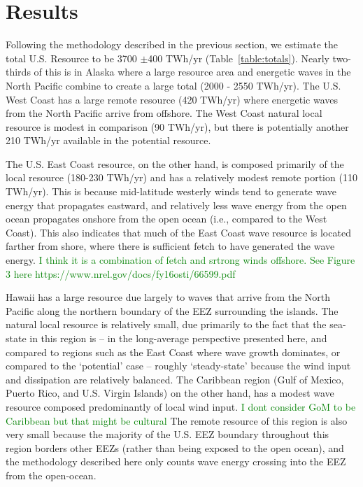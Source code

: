 \section{Results}

Following the methodology described in the previous section, we estimate the total U.S. Resource to be 3700 $\pm$400 TWh/yr (Table~\ref{table:totals}). Nearly two-thirds of this is in Alaska where a large resource area and energetic waves in the North Pacific combine to create a large total (2000 - 2550 TWh/yr). The U.S. West Coast has a large remote resource (420 TWh/yr) where energetic waves from the North Pacific arrive from offshore.  The West Coast natural local resource is modest in comparison (90 TWh/yr), but there is potentially another 210 TWh/yr available in the potential resource.

The U.S. East Coast resource, on the other hand, is composed primarily of the local resource (180-230 TWh/yr) and has a relatively modest remote portion (110 TWh/yr). This is because mid-latitude westerly winds tend to generate wave energy that propagates eastward, and relatively less wave energy from the open ocean propagates onshore from the open ocean (i.e., compared to the West Coast). This also indicates that much of the East Coast wave resource is located farther from shore, where there is sufficient fetch to have generated the wave energy.  \textcolor{green}{I think it is a combination of fetch and srtrong winds offshore. See Figure 3 here {https://www.nrel.gov/docs/fy16osti/66599.pdf}}

Hawaii has a large resource due largely to waves that arrive from the North Pacific along the northern boundary of the EEZ surrounding the islands. The natural local resource is relatively small, due primarily to the fact that the sea-state in this region is -- in the long-average perspective presented here, and compared to regions such as the East Coast where wave growth dominates, or compared to the `potential' case -- roughly `steady-state' because the wind input and dissipation are relatively balanced. The Caribbean region (Gulf of Mexico, Puerto Rico, and U.S. Virgin Islands) on the other hand, has a modest wave resource composed predominantly of local wind input.  \textcolor{green}{I dont consider GoM to be Caribbean but that might be cultural} The remote resource of this region is also very small because the majority of the U.S. EEZ boundary throughout this region borders other EEZs (rather than being exposed to the open ocean), and the methodology described here only counts wave energy crossing into the EEZ from the open-ocean.

